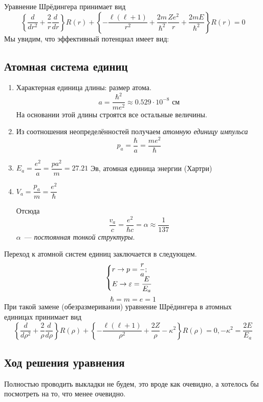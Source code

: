 Уравнение Шрёдингера принимает вид
$$
    \left\{
        \dfrac{d}{dr^2} + \dfrac{2}{r} \dfrac{d}{dr}
    \right\} R(r) + 
    \left\{
        -\dfrac{\ell(\ell+1)}{r^2} + \dfrac{2m}{{\hbar}^2} \dfrac{Z e^2}{r} + \dfrac{2mE}{\hbar^2}
    \right\} R(r) = 0
$$
Мы увидим, что эффективный потенциал имеет вид:
\subsection{Атомная система единиц}
\begin{enumerate}
    \item Характерная единица длины: размер атома.
$$
    a = \dfrac{\hbar^2}{me^2} \approx 0.529 \cdot 10^{-8} \text{ см}
$$
На основании этой длины строятся все остальные величины.
  \item Из соотношения неопределённостей получаем \emph{атомную единицу импульса}
$$
    p_{a} = \dfrac{\hbar}{a} = \dfrac{me^2}{\hbar}
$$
  \item $E_a = \dfrac{e^2}{a} = \dfrac{pa^2}{m} = 27.21$ Эв, атомная единица энергии (Хартри)
  \item $V_a = \dfrac{p_a}{m} = \dfrac{e^2}{\hbar}$
  
  Отсюда
  $$
    \dfrac{v_a}{c} = \dfrac{e^2}{\hbar c} = \alpha \approx \dfrac{1}{137}
  $$
  $\alpha$~--- \emph{постоянная тонкой структуры}.
\end{enumerate}
Переход к атомной систем единиц заключается в следующем.
$$
    \begin{cases}
        r \to p = \dfrac{r}{a};\\
        E \to \varepsilon = \dfrac{E}{E_a}
    \end{cases}
$$
$$
    \hbar = m = e = 1
$$
При такой замене (обезразмеривании) уравнение Шрёдингера в атомных единицах принимает вид
$$
    \left\{
        \dfrac{d}{d\rho^2} + \dfrac{2}{\rho} \dfrac{d}{d\rho}
    \right\} R(\rho) +
    \left\{
        -\dfrac{\ell(\ell+1)}{\rho^2} + \dfrac{2Z}{\rho}  -\kappa^2
    \right\} R(\rho) = 0, -\kappa^2=\frac{2E}{E_a}
$$
\subsection{Ход решения уравнения}
Полностью проводить выкладки не будем, это вроде как очевидно, а хотелось бы посмотреть на то, что менее очевидно.

